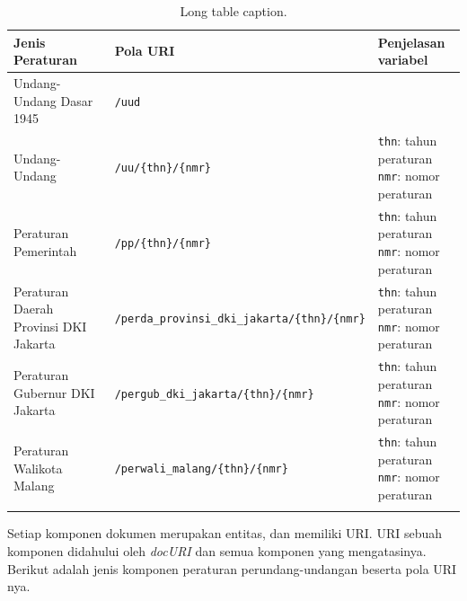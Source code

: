 \begin{longtable}[l]{|p{}|p{}|p{}|}
  \hline
  Jenis Peraturan                       & Pola URI                                                & Penjelasan variabel                        \\ \hline \endhead
  Undang-Undang Dasar 1945              & \texttt{/uud}                                           &                                            \\ \hline
  Undang-Undang                         & \texttt{/uu/\{thn\}/\{nmr\}}                            & \makecell[l]{\texttt{thn}: tahun peraturan \\\texttt{nmr}: nomor peraturan} \\ \hline
  Peraturan Pemerintah                  & \texttt{/pp/\{thn\}/\{nmr\}}                            & \makecell[l]{\texttt{thn}: tahun peraturan \\\texttt{nmr}: nomor peraturan} \\\hline
  Peraturan Daerah Provinsi DKI Jakarta & \texttt{/perda\_provinsi\_dki\_jakarta/\{thn\}/\{nmr\}} & \makecell[l]{\texttt{thn}: tahun peraturan \\\texttt{nmr}: nomor peraturan} \\\hline
  Peraturan Gubernur DKI Jakarta        & \texttt{/pergub\_dki\_jakarta/\{thn\}/\{nmr\}}          & \makecell[l]{\texttt{thn}: tahun peraturan \\\texttt{nmr}: nomor peraturan} \\\hline
  Peraturan Walikota Malang             & \texttt{/perwali\_malang/\{thn\}/\{nmr\}}               & \makecell[l]{\texttt{thn}: tahun peraturan \\\texttt{nmr}: nomor peraturan} \\\hline
  \caption{Long table caption.\label{longs2}}                                                                                                  \\
\end{longtable}

Setiap komponen dokumen merupakan entitas, dan memiliki URI. URI sebuah komponen didahului oleh
\textit{docURI} dan semua komponen yang mengatasinya. Berikut adalah jenis komponen peraturan
perundang-undangan beserta pola URI nya.

